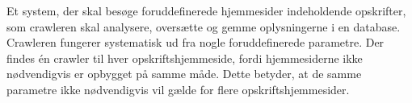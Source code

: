 {Et system, der skal besøge foruddefinerede hjemmesider indeholdende opskrifter, som crawleren skal analysere, oversætte og gemme oplysningerne i en database.}
{Crawleren fungerer systematisk ud fra nogle foruddefinerede parametre. Der findes én crawler til hver opskriftshjemmeside, fordi hjemmesiderne ikke nødvendigvis er opbygget på samme måde. Dette betyder, at de samme parametre ikke nødvendigvis vil gælde for flere opskriftshjemmesider.}
